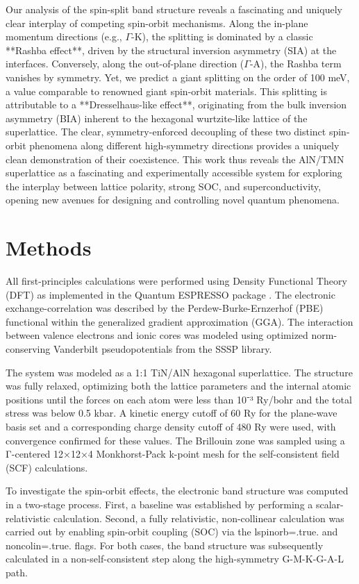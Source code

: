\documentclass[aps,prl,reprint,superscriptaddress]{revtex4-2}
\begin{document}
Our analysis of the spin-split band structure reveals a fascinating and uniquely clear interplay of competing spin-orbit mechanisms. Along the in-plane momentum directions (e.g., $\Gamma$-K), the splitting is dominated by a classic **Rashba effect**, driven by the structural inversion asymmetry (SIA) at the interfaces. Conversely, along the out-of-plane direction ($\Gamma$-A), the Rashba term vanishes by symmetry. Yet, we predict a giant splitting on the order of 100 meV, a value comparable to renowned giant spin-orbit materials. This splitting is attributable to a **Dresselhaus-like effect**, originating from the bulk inversion asymmetry (BIA) inherent to the hexagonal wurtzite-like lattice of the superlattice. The clear, symmetry-enforced decoupling of these two distinct spin-orbit phenomena along different high-symmetry directions provides a uniquely clean demonstration of their coexistence. This work thus reveals the AlN/TMN superlattice as a fascinating and experimentally accessible system for exploring the interplay between lattice polarity, strong SOC, and superconductivity, opening new avenues for designing and controlling novel quantum phenomena.

\section{Methods}

All first-principles calculations were performed using Density Functional Theory (DFT) as implemented in the Quantum ESPRESSO package \cite{giannozzi_quantum_2009}. The electronic exchange-correlation was described by the Perdew-Burke-Ernzerhof (PBE) functional within the generalized gradient approximation (GGA). The interaction between valence electrons and ionic cores was modeled using optimized norm-conserving Vanderbilt pseudopotentials from the SSSP library.

The system was modeled as a 1:1 TiN/AlN hexagonal superlattice. The structure was fully relaxed, optimizing both the lattice parameters and the internal atomic positions until the forces on each atom were less than 10⁻³ Ry/bohr and the total stress was below 0.5 kbar. A kinetic energy cutoff of 60 Ry for the plane-wave basis set and a corresponding charge density cutoff of 480 Ry were used, with convergence confirmed for these values. The Brillouin zone was sampled using a Γ-centered 12×12×4 Monkhorst-Pack k-point mesh for the self-consistent field (SCF) calculations.

To investigate the spin-orbit effects, the electronic band structure was computed in a two-stage process. First, a baseline was established by performing a scalar-relativistic calculation. Second, a fully relativistic, non-collinear calculation was carried out by enabling spin-orbit coupling (SOC) via the lspinorb=.true. and noncolin=.true. flags. For both cases, the band structure was subsequently calculated in a non-self-consistent step along the high-symmetry G-M-K-G-A-L path.
\end{document}
